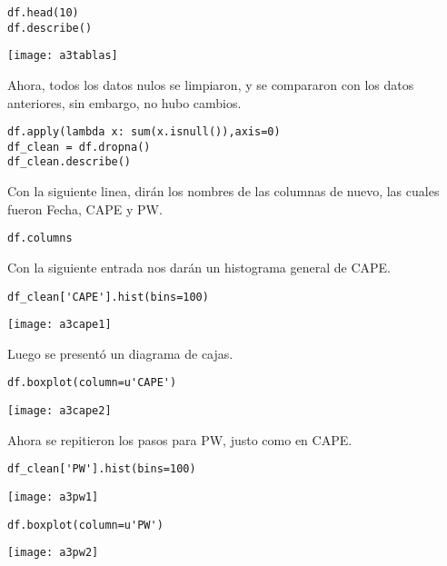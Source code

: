 \documentclass[12pt,a4paper]{article}
\begin{document}
\begin{verbatim}
df.head(10)
df.describe()
\end{verbatim}

\begin{center}
\texttt{[image: a3tablas]}
\end{center}

Ahora, todos los datos nulos se limpiaron, y se compararon con los datos anteriores, sin embargo, no hubo cambios.
\begin{verbatim}
df.apply(lambda x: sum(x.isnull()),axis=0)
df_clean = df.dropna()
df_clean.describe()
\end{verbatim}

Con la siguiente linea, dirán los nombres de las columnas de nuevo, las cuales fueron Fecha, CAPE y PW.
\begin{verbatim}
df.columns
\end{verbatim}

Con la siguiente entrada nos darán un histograma general de CAPE.

\begin{verbatim}
df_clean['CAPE'].hist(bins=100)
\end{verbatim}

\begin{center}
\texttt{[image: a3cape1]}
\end{center}

Luego se presentó un diagrama de cajas.

\begin{verbatim}
df.boxplot(column=u'CAPE')
\end{verbatim}

\begin{center}
\texttt{[image: a3cape2]}
\end{center}

Ahora se repitieron los pasos para PW, justo como en CAPE.

\begin{verbatim}
df_clean['PW'].hist(bins=100)
\end{verbatim}

\begin{center}
\texttt{[image: a3pw1]}
\end{center}

\begin{verbatim}
df.boxplot(column=u'PW')
\end{verbatim}

\begin{center}
\texttt{[image: a3pw2]}
\end{center}
\end{document}
